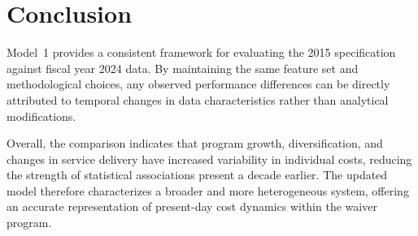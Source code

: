 \section{Conclusion}

Model~1 provides a consistent framework for evaluating the 2015 specification against fiscal year 2024 data.  
By maintaining the same feature set and methodological choices, any observed performance differences can be directly attributed to temporal changes in data characteristics rather than analytical modifications.

Overall, the comparison indicates that program growth, diversification, and changes in service delivery have increased variability in individual costs, reducing the strength of statistical associations present a decade earlier.  
The updated model therefore characterizes a broader and more heterogeneous system, offering an accurate representation of present-day cost dynamics within the waiver program.


